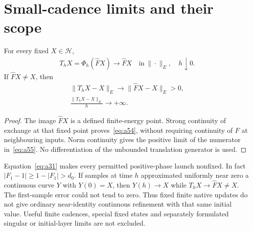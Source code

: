 \section{Small-cadence limits and their scope}\label{sec:cadence}
\begin{proposition}\label{prop:onestep}
For every fixed $X\in\mathcal H$,
\begin{equation}\label{eq:a54}%
\begin{gathered}
T_hX=\Phi_h(\widehat FX)\longrightarrow\widehat FX
\quad\mathrm{in}\ \|\cdot\|_E,\quad h\downarrow0.
\end{gathered}
\end{equation}
If $\widehat FX\ne X$, then
\begin{equation}\label{eq:a55}%
\begin{gathered}
\|T_hX-X\|_E\longrightarrow\|\widehat FX-X\|_E>0,\\ \frac{\|T_hX-X\|_E}{h}\longrightarrow+\infty.
\end{gathered}
\end{equation}
\end{proposition}
\begin{proof}
The image $\widehat FX$ is a defined finite-energy point. Strong continuity of exchange at that fixed point proves~\eqref{eq:a54}, without requiring continuity of $F$ at neighbouring inputs. Norm continuity gives the positive limit of the numerator in~\eqref{eq:a55}. No differentiation of the unbounded translation generator is used.
\end{proof}
Equation~\eqref{eq:a31} makes every permitted positive-phase launch nonfixed. In fact $|F_1-1|\ge1-|F_1|>d_0$. If samples at time $h$ approximated uniformly near zero a continuous curve $Y$ with $Y(0)=X$, then $Y(h)\to X$ while $T_hX\to\widehat FX\ne X$. The first-sample error could not tend to zero. Thus fixed finite native updates do not give ordinary near-identity continuous refinement with that same initial value. Useful finite cadences, special fixed states and separately formulated singular or initial-layer limits are not excluded.

